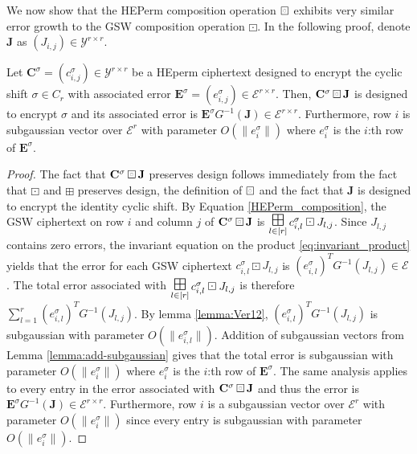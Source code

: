 We now show that the HEPerm composition operation $\boxring$ exhibits very similar error growth to the GSW composition operation $\boxdot$. In the following proof, denote $\mathbf{J}$ as $(J_{i,j}) \in \mathcal{Y}^{r \times r}$. 
\begin{lemma}\label{lemma:HEperm_error}
    Let $\mathbf{C}^{\sigma} = (c^{\sigma}_{i,j}) \in \mathcal{Y}^{r \times r}$ be a HEperm ciphertext designed to encrypt the cyclic shift $\sigma \in C_r$ with associated error $\mathbf{E}^{\sigma} = (e^{\sigma}_{i,j}) \in \mathcal{E}^{r \times r}$. Then, $\mathbf{C}^{\sigma} \boxring \mathbf{J}$ is designed to encrypt $\sigma$ and its associated error is $\mathbf{E}^{\sigma} G^{-1}(\mathbf{J}) \in \mathcal{E}^{r \times r}$. Furthermore, row $i$ is subgaussian vector over $\mathcal{E}^r$ with parameter $O(\|e^{\sigma}_i\|)$ where $e^{\sigma}_i$ is the $i$:th row of $\mathbf{E}^{\sigma}$. 
\end{lemma}
\begin{proof}
    The fact that $\mathbf{C}^{\sigma} \boxring \mathbf{J}$ preserves design follows immediately from the fact that $\boxdot$ and $\boxplus$ preserves design, the definition of $\boxring$ and the fact that $\mathbf{J}$ is designed to encrypt the identity cyclic shift.
    By Equation \ref{HEPerm_composition}, the GSW ciphertext on row $i$ and column $j$ of $\mathbf{C}^{\sigma} \boxring \mathbf{J}$ is $\bigboxplus\limits_{l \in [r]} c_{i,l}^{\sigma} \boxdot J_{l,j}$. Since $J_{l,j}$ contains zero errors, the invariant equation on the product \ref{eq:invariant_product} yields that the error for each GSW ciphertext $c_{i,l}^{\sigma} \boxdot J_{l,j}$ is $(e_{i,l}^{\sigma})^T G^{-1}(J_{l,j}) \in \mathcal{E}$. The total error associated with $\bigboxplus\limits_{l \in [r]} c_{i,l}^{\sigma} \boxdot J_{l,j}$ is therefore $\sum\limits_{l=1}^r (e_{i,l}^{\sigma})^T G^{-1}(J_{l,j})$. By lemma \ref{lemma:Ver12}, $(e_{i,l}^{\sigma})^T G^{-1}(J_{l,j})$ is subgaussian with parameter $O(\|e_{i,l}^{\sigma}\|)$. Addition of subgaussian vectors from Lemma \ref{lemma:add-subgaussian} gives that the total error is subgaussian with parameter $O(\|e_i^{\sigma}\|)$ where $e_i^{\sigma}$ is the $i$:th row of $\mathbf{E}^{\sigma}$. The same analysis applies to every entry in the error associated with $\mathbf{C}^{\sigma} \boxring \mathbf{J}$ and thus the error is $\mathbf{E}^{\sigma} G^{-1}(\mathbf{J}) \in \mathcal{E}^{r \times r}$. Furthermore, row $i$ is a subgaussian vector over $\mathcal{E}^r$ with parameter $O(\|e^{\sigma}_i\|)$ since every entry is subgaussian with parameter $O(\|e^{\sigma}_i\|)$.
\end{proof}
